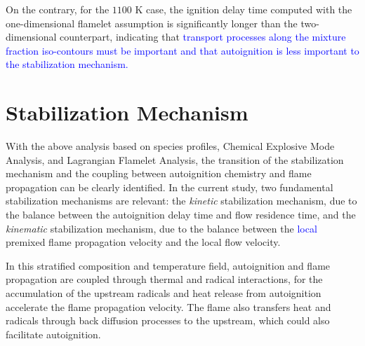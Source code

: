\documentclass[review,3p,times]{elsarticle}
\begin{document}
On the contrary, for the $1100$ K case, the ignition delay time computed with the one-dimensional flamelet assumption is significantly longer than the two-dimensional counterpart, indicating that 
\textcolor{blue}{transport processes along the mixture fraction iso-contours must be important and that autoignition is less important to the stabilization mechanism.}


\section{Stabilization Mechanism} \label{sec:regime}
With the above analysis based on species profiles, Chemical Explosive Mode Analysis, and Lagrangian Flamelet Analysis, the transition of the stabilization mechanism and the coupling between autoignition chemistry and flame propagation can be clearly identified.  In the current study, two fundamental stabilization mechanisms are relevant: the \emph {kinetic} stabilization mechanism, due to the balance between the autoignition delay time and flow residence time, and the \emph {kinematic} stabilization mechanism, due to the balance between the \textcolor{blue}{local} premixed flame propagation velocity and the local flow velocity.  

In this stratified composition and temperature field, autoignition and flame propagation are coupled through thermal and radical interactions, for the accumulation of the upstream radicals and heat release from autoignition accelerate the flame propagation velocity.  The flame also transfers heat and radicals through back diffusion processes to the upstream, which could also facilitate autoignition.
\end{document}
